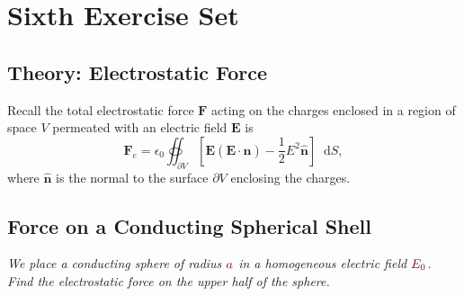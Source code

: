 \documentclass[11pt, a4paper]{article}
\newcommand{\diff}{\mathop{}\!\mathrm{d}} %
\newcommand{\dmath}[1]{\textcolor{Maroon}{#1}}  %
\renewcommand{\vec}[1]{\bm{#1}} %
\newcommand{\uvec}[1]{\hat{\vec{#1}}} %
\newcommand{\E}{\vec{E}}  %
\newcommand{\ee}{\epsilon_{0}}  %
\begin{document}
\section{Sixth Exercise Set}

\subsection{Theory: Electrostatic Force}
Recall the total electrostatic force $ \vec{F} $ acting on the charges enclosed in a region of space $ V $ permeated with an electric field $ \E $ is
\begin{equation*}
	\vec{F}_{e} = \ee \oiint_{\partial V}\left[\E(\E\cdot \uvec{n}) - \frac{1}{2}E^{2} \uvec{n}\right] \diff S,
\end{equation*}
where $ \uvec{n} $ is the normal to the surface $ \partial V $ enclosing the charges.


\subsection{Force on a Conducting Spherical Shell}
\textit{We place a conducting sphere of radius $ \dmath{a} $ in a homogeneous electric field $ \dmath{E_{0}} $. Find the electrostatic force on the upper half of the sphere.}
\end{document}
